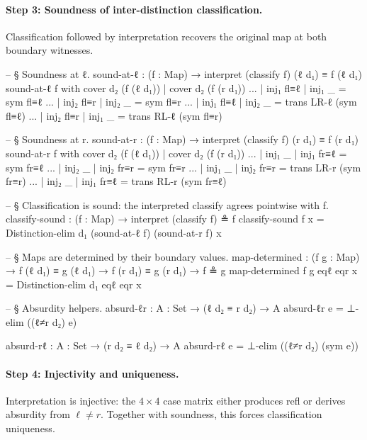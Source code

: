 \documentclass[11pt,a4paper]{book}
\def\texttt#1{#1}%
\begin{document}
\paragraph{Step 3: Soundness of inter-distinction classification.}
Classification followed by interpretation recovers the original map at both boundary witnesses.

\begin{code}
  -- § Soundness at ℓ.
  sound-at-ℓ : (f : Map) → interpret (classify f) (ℓ d₁) ≡ f (ℓ d₁)
  sound-at-ℓ f with cover d₂ (f (ℓ d₁)) | cover d₂ (f (r d₁))
  ... | inj₁ fl≡ℓ | inj₁ _     = sym fl≡ℓ
  ... | inj₂ fl≡r | inj₂ _     = sym fl≡r
  ... | inj₁ fl≡ℓ | inj₂ _     = trans LR-ℓ (sym fl≡ℓ)
  ... | inj₂ fl≡r | inj₁ _     = trans RL-ℓ (sym fl≡r)

  -- § Soundness at r.
  sound-at-r : (f : Map) → interpret (classify f) (r d₁) ≡ f (r d₁)
  sound-at-r f with cover d₂ (f (ℓ d₁)) | cover d₂ (f (r d₁))
  ... | inj₁ _     | inj₁ fr≡ℓ = sym fr≡ℓ
  ... | inj₂ _     | inj₂ fr≡r = sym fr≡r
  ... | inj₁ _     | inj₂ fr≡r = trans LR-r (sym fr≡r)
  ... | inj₂ _     | inj₁ fr≡ℓ = trans RL-r (sym fr≡ℓ)

  -- § Classification is sound: the interpreted classify agrees pointwise with f.
  classify-sound : (f : Map) → interpret (classify f) ≗ f
  classify-sound f x = Distinction-elim d₁ (sound-at-ℓ f) (sound-at-r f) x

  -- § Maps are determined by their boundary values.
  map-determined :
    (f g : Map) →
    f (ℓ d₁) ≡ g (ℓ d₁) →
    f (r d₁) ≡ g (r d₁) →
    f ≗ g
  map-determined f g eqℓ eqr x = Distinction-elim d₁ eqℓ eqr x

  -- § Absurdity helpers.
  absurd-ℓr : {A : Set} → (ℓ d₂ ≡ r d₂) → A
  absurd-ℓr e = ⊥-elim ((ℓ≠r d₂) e)

  absurd-rℓ : {A : Set} → (r d₂ ≡ ℓ d₂) → A
  absurd-rℓ e = ⊥-elim ((ℓ≠r d₂) (sym e))
\end{code}

\paragraph{Step 4: Injectivity and uniqueness.}
Interpretation is injective: the $4 \times 4$ case matrix either produces \texttt{refl} or derives absurdity from $\ell \neq r$.
Together with soundness, this forces classification uniqueness.
\end{document}
